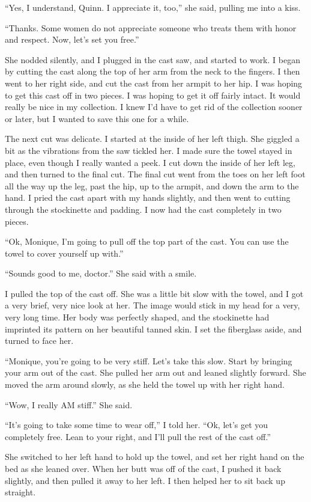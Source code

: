 ``Yes, I understand, Quinn. I appreciate it, too,'' she said, pulling me into a kiss.

``Thanks. Some women do not appreciate someone who treats them with honor and respect.
Now, let's set you free.''

She nodded silently, and I plugged in the cast saw, and started to work. I began by cutting
the cast along the top of her arm from the neck to the fingers. I then went to her right side,
and cut the cast from her armpit to her hip. I was hoping to get this cast off in two pieces. I
was hoping to get it off fairly intact. It would really be nice in my collection. I knew I'd
have to get rid of the collection sooner or later, but I wanted to save this one for a while.

The next cut was delicate. I started at the inside of her left thigh. She giggled a bit as
the vibrations from the saw tickled her. I made sure the towel stayed in place, even though I
really wanted a peek. I cut down the inside of her left leg, and then turned to the final cut.
The final cut went from the toes on her left foot all the way up the leg, past the hip, up to
the armpit, and down the arm to the hand. I pried the cast apart with my hands slightly, and
then went to cutting through the stockinette and padding. I now had the cast completely in two
pieces.

``Ok, Monique, I'm going to pull off the top part of the cast. You can use the towel to
cover yourself up with.''

``Sounds good to me, doctor.'' She said with a smile.

I pulled the top of the cast off. She was a little bit slow with the towel, and I got a
very brief, very nice look at her. The image would stick in my head for a very, very long time.
Her body was perfectly shaped, and the stockinette had imprinted its pattern on her beautiful
tanned skin. I set the fiberglass aside, and turned to face her.

``Monique, you're going to be very stiff. Let's take this slow. Start by bringing your arm
out of the cast. She pulled her arm out and leaned slightly forward. She moved the arm around
slowly, as she held the towel up with her right hand.

``Wow, I really AM stiff.'' She said.

``It's going to take some time to wear off,'' I told her. ``Ok, let's get you completely
free. Lean to your right, and I'll pull the rest of the cast off.''

She switched to her left hand to hold up the towel, and set her right hand on the bed as
she leaned over. When her butt was off of the cast, I pushed it back slightly, and then pulled
it away to her left. I then helped her to sit back up straight.

